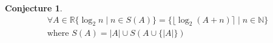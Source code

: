 \documentclass{article}
\newtheorem{conj}{Conjecture}
\begin{document}
	\begin{conj}
		\begin{gather*}
			\forall A \in \mathbb{R} \{ \log_2n \mid n \in S(A) \} = \{ \lfloor
				\log_2(A + n)\rceil \mid n \in \mathbb{N} \} \\
			\text{where } S(A) = |A| \cup S(A \cup \{|A|\})
		\end{gather*}
	\end{conj}
\end{document}

